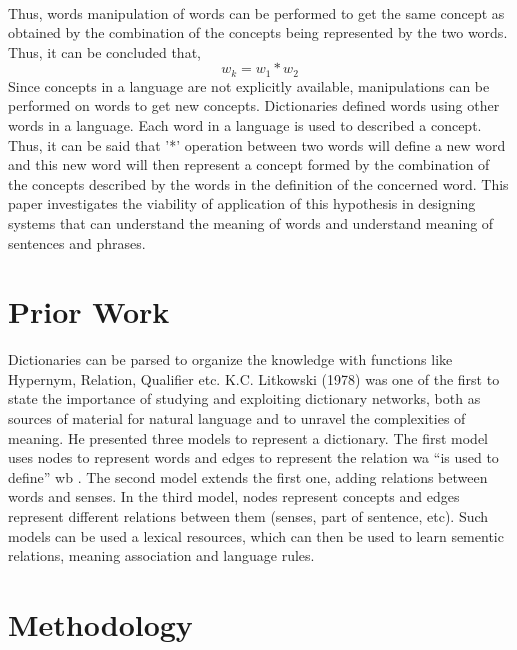 \documentclass[runningheads]{llncs}
\begin{document}
\paragraph{}
Thus, words manipulation of words can be performed to get the same concept as obtained by the combination of the concepts being represented by the two words. Thus, it can be concluded that, 
\begin{equation}
    w_{k} = w_{1}*w_{2}
\end{equation}
Since concepts in a language are not explicitly available, manipulations can be performed on words to get new concepts. Dictionaries defined  words using other words in a language. Each word in a language is used to described a concept. Thus, it can be said that '*' operation between two words will define a new word and this new word will then represent a concept formed by the combination of the concepts described by the words in the definition of the concerned word. This paper investigates the viability of application of this hypothesis in designing systems that can understand the meaning of words and understand meaning of sentences and phrases.
\section{Prior Work}
Dictionaries can be parsed to organize the knowledge with functions like Hypernym, Relation, Qualifier etc\cite{dict_use}. K.C. Litkowski (1978) was one of the first to state the importance of studying and exploiting dictionary networks, both as sources of material for natural language and to unravel the complexities of meaning. He presented three models to represent a dictionary. The first model uses nodes to represent words and edges to represent the relation w{\scriptsize a} “is used to define” w{\scriptsize b} . The second model extends the first one, adding relations between words and senses. In the third model, nodes represent concepts and edges represent different relations between them (senses, part of sentence, etc). Such models can be used a lexical resources, which can then be used to learn sementic relations, meaning association and language rules.
\section{Methodology}
\end{document}
